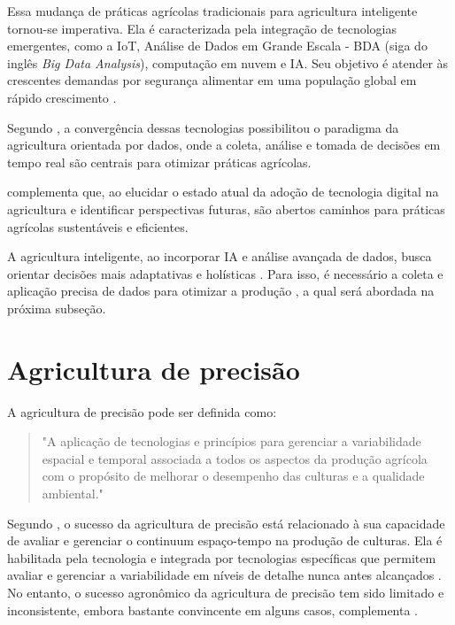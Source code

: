 Essa mudança de práticas agrícolas tradicionais para agricultura inteligente tornou-se imperativa. Ela é caracterizada pela integração de tecnologias emergentes, como a IoT, Análise de Dados em Grande Escala - BDA (siga do inglês \textit{Big Data Analysis}), computação em nuvem e IA. Seu objetivo é atender às crescentes demandas por segurança alimentar em uma população global em rápido crescimento \parencite{Gurjeet_smart2022, Garg_smart2023}.

Segundo \textcite{Garg_smart2023}, a convergência dessas tecnologias possibilitou o paradigma da agricultura orientada por dados, onde a coleta, análise e tomada de decisões em tempo real são centrais para otimizar práticas agrícolas.

\textcite{Gurjeet_smart2022} complementa que, ao elucidar o estado atual da adoção de tecnologia digital na agricultura e identificar perspectivas futuras, são abertos caminhos para práticas agrícolas sustentáveis e eficientes.

A agricultura inteligente, ao incorporar IA e análise avançada de dados, busca orientar decisões mais adaptativas e holísticas \parencite{Garg_smart2023}. Para isso, é necessário a coleta e aplicação precisa de dados para otimizar a produção \parencite{Lamine_precision2024}, a qual será abordada na próxima subseção.

\section{Agricultura de precisão}

A agricultura de precisão pode ser definida como: 

\begin{quote}
  "A aplicação de tecnologias e princípios para gerenciar a variabilidade espacial e temporal associada a todos os aspectos da produção agrícola com o propósito de melhorar o desempenho das culturas e a qualidade ambiental." \parencite[{p. 1}]{Pierce_precision1999}
\end{quote}

Segundo \textcite{Pierce_precision1999}, o sucesso da agricultura de precisão está relacionado à sua capacidade de avaliar e gerenciar o continuum espaço-tempo na produção de culturas. Ela é habilitada pela tecnologia e integrada por tecnologias específicas que permitem avaliar e gerenciar a variabilidade em níveis de detalhe nunca antes alcançados \parencite{Zhang_precision2002}. No entanto, o sucesso agronômico da agricultura de precisão tem sido limitado e inconsistente, embora bastante convincente em alguns casos, complementa \textcite{Zhang_precision2002}.

